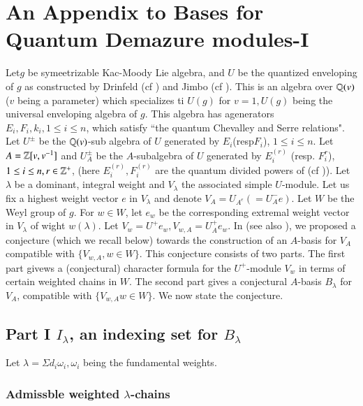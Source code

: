 \chapter{An Appendix to Bases for Quantum Demazure modules-I}\label{chap10}


\rhead[\textit{}]{\thepage}

\setcounter{pageoriginal}{220}
Let\pageoriginale $g$ be symeetrizable Kac-Moody Lie algebra, and $U$ be the quantized enveloping of $g$ as constructed by Drinfeld (cf \cite{chap10-keyD}) and Jimbo (cf \cite{chap10-keyJ}). This is an algebra over $\mathbb{Q}(v)$ ($v$ being a parameter) which specializes ti $U(g)$ for $v=1, U(g)$ being the universal enveloping algebra of $g$. This algebra has agenerators $E_{i}, F_{i}, k_{i}, 1 \leq i \leq n$, which satisfy ``the quantum Chevalley and Serre relations". Let $U^{\pm}$ be the $\mathbb{Q}(v)$-sub algebra of $U$ generated by $E_{i}$(resp$F_{i}$), $1 \leq i \leq n$. Let $A = \mathbb{Z}[v, v^{-1}]$ and $U_{A}^{\pm}$ be the $A$-subalgebra of $U$ generated by $E_{i}^{(r)}$ (resp. $F_{i}^{r}$), $1 \leq i \leq n, r \in \mathbb{Z}^{+}$, (here $E_{i}^{(r)}, F_{i}^{(r)}$ are the quantum divided powers of (cf \cite{chap10-keyJ})). Let $\lambda$ be a dominant, integral weight and $V_{\lambda}$ the associated simple $U$-module. Let us fix a highest weight vector $e$ in $V_{\lambda}$ and denote $V_{A}=U_{A^{e}}(=U_{A}^{-}e)$. Let $W$ be the Weyl group of $g$. For $w \in W$, let $e_{w}$ be the corresponding extremal weight vector in $V_{\lambda}$ of wight $w(\lambda)$. Let $V_{w} = U^{+}e_{w}, V_{w, A} = U_{A}^{+}e_{w}$. In \cite{chap10-keyLa} (see also \cite{chap10-keyLS}), we proposed a conjecture (which we recall below) towards the construction of an $A$-basis for $V_{A}$ compatible with $\{V_{w, A}, w \in W\}$. This conjecture consists of two parts. The first part givews a (conjectural) character formula for the  $U^{+}$-module $V_{w}$ in terms of certain weighted chains in $W$. The second part gives a conjectural $A$-basis $B_{\lambda}$ for $V_{A}$, compatible with
 $\{V_{w, A} w \in W \}$. We now state the conjecture.  

\section*{Part I \boldmath$I_{\lambda}$, an indexing set for $B_{\lambda}$}
Let $\lambda = \Sigma d_{i}\omega_{i}, \omega_{i}$ being the fundamental weights.

\medskip
\subsection*{Admissble weighted \boldmath$\lambda$-chains}
~

